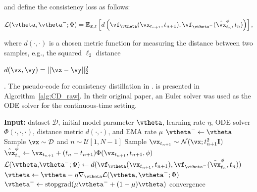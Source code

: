 \documentclass{article} %
\begin{document}
and define the consistency loss as follows:
\begin{small}
\begin{equation}
    \mathcal{L}(\vtheta,\vtheta^-;\Phi)=\mathbb{E}_{\boldsymbol{x},t}
    \left[d\left(\vf_\vtheta(\vx_{t_{n+1}},t_{n+1}),\vf_{\vtheta^{-}}(\hat{\vx}^\phi_{t_n},t_n)\right)\right],\label{eq:consistency_loss}
\end{equation}
\end{small}
where $d(\cdot,\cdot)$ is a chosen metric function for measuring the distance between two samples, e.g., the squared $\ell_2$ distance \begin{small}$d(\vx,\vy)=||\vx-\vy||_2^2$\end{small}. The pseudo-code for consistency distillation in \cite{song2023consistency}.
is presented in Algorithm~\ref{alg:CD_raw}.
In their original paper, an Euler solver was used as the ODE solver for the continuous-time setting.

\begin{algorithm}[H]
		\begin{minipage}{\linewidth}
			\caption{Consistency Distillation (CD) \citep{song2023consistency}}\label{alg:CD_raw}
			\begin{algorithmic}
                \STATE \textbf{Input:} dataset $\mathcal{D}$, initial model parameter $\vtheta$, learning rate $\eta$, ODE solver $\Phi(\cdot,\cdot,\cdot)$, distance metric $d(\cdot,\cdot)$, and EMA rate $\mu$
				\STATE $\vtheta^-\leftarrow\vtheta$
                \REPEAT
				\STATE Sample $\vx \sim \mathcal{D}$ and $n\sim \mathcal{U}[1,N-1]$
				\STATE Sample $\vx_{t_{n+1}}\sim \mathcal{N}(\vx;t^2_{n+1}\mathbf{I})$
                \STATE $\begin{aligned}\hat{\vx}^\phi_{t_n}\leftarrow \vx_{t_{n+1}}+(t_n-t_{n+1})\Phi(\vx_{t_{n+1}},t_{n+1},\phi)\end{aligned}$
                \STATE $\begin{aligned}\mathcal{L}(\vtheta,&\vtheta^-; \Phi)\leftarrow d(\vf_\vtheta(\vx_{t_{n+1}},t_{n+1}),\vf_{\vtheta^-}(\hat{\vx}_{t_n}^\phi,t_n))\end{aligned}$
		      \STATE $\vtheta\leftarrow\vtheta-\eta\nabla_\vtheta\mathcal{L}(\vtheta,\vtheta^-; \Phi)$
                \STATE $\vtheta^-\leftarrow \text{stopgrad}(\mu\vtheta^-+(1-\mu)\vtheta)$
                \UNTIL convergence
			\end{algorithmic} 
		\end{minipage}
	\end{algorithm}
\end{document}
